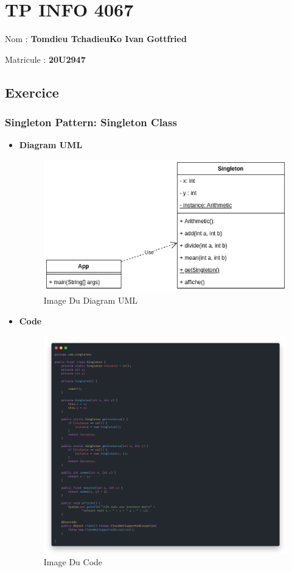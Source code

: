\hypertarget{tp-info-4067}{%
\section{TP INFO 4067}\label{tp-info-4067}}

Nom : \textbf{Tomdieu TchadieuKo Ivan Gottfried}

Matricule : \textbf{20U2947}

\hypertarget{exercice}{%
\subsection{Exercice}\label{exercice}}

\hypertarget{singleton-pattern-singleton-class}{%
\subsubsection{Singleton Pattern: Singleton
Class}\label{singleton-pattern-singleton-class}}

\begin{itemize}
\item
  \textbf{Diagram UML}

  \begin{figure}
  \centering
  \includegraphics{diagram.png}
  \caption{Image Du Diagram UML}
  \end{figure}
\item
  \textbf{Code}

  \begin{figure}
  \centering
  \includegraphics{singleton.png}
  \caption{Image Du Code}
  \end{figure}
\end{itemize}
